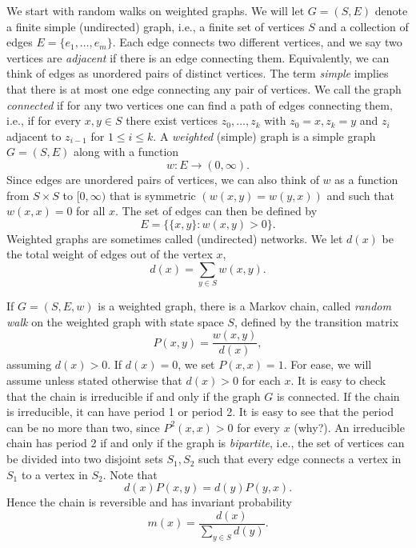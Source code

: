 \documentclass{stml-l}
\theoremstyle{definition}
\numberwithin{equation}{chapter}
\numberwithin{figure}{chapter}
\numberwithin{figure}{section}
\begin{document}
We start with random walks on weighted graphs. We will let $G=(S,E)$
denote a finite simple (undirected) graph, i.e., a finite set of
vertices $S$ and a collection of edges $E=\{e_{1},\ldots,e_{m}\}$.
Each edge connects two different vertices, and we say two vertices
are \emph{adjacent} if there is an edge connecting them.
Equivalently, we can think of edges as unordered pairs of distinct
vertices. The term \emph{simple} implies that there is at most one
edge connecting any pair of vertices. We call the graph
\emph{connected} if for any two vertices one can find a path of
edges connecting them, i.e., if for every $x,y \in S$ there exist
vertices $z_{0},\ldots,z_{k}$ with $z_{0}=x,z_{k}=y$ and $z_{i}$
adjacent to $z_{i-1}$ for $1\leq i\leq k$. A \emph{weighted}
(simple) graph is a simple graph $G=(S,E)$ along with a function
\begin{equation*}
w:E\rightarrow(0,\infty).
\end{equation*}
Since edges are unordered pairs of vertices, we can also think of
$w$ as a function from $S\times S$ to $[0,\infty)$ that is symmetric
$(w(x,y)=w(y,x))$ and such that $w(x,x)=0$ for all $x$. The set of
edges can then be defined by
\begin{equation*}
E=\{\{x,y\}:w(x,y)>0\}.
\end{equation*}
Weighted graphs are sometimes called (undirected) networks. We let
$d(x)$ be the total weight of edges out of the vertex $x$,
\begin{equation*}
d(x)=\sum\limits_{y\in S}w(x,y).
\end{equation*}

If $G=(S,E,w)$ is a weighted graph, there is a Markov chain, called
\emph{random walk} on the weighted graph with state space $S$,
defined by the transition matrix
\begin{equation*}
P(x,y)=\frac{w(x,y)}{d(x)},
\end{equation*}
assuming $d(x)>0$. If $d(x)=0$, we set $P(x,x)=1$. For ease, we will
assume unless stated otherwise that $d(x)>0$ for each $x$. It is
easy to check that the chain is irreducible if and only if the graph
$G$ is connected. If the chain is irreducible, it can have period 1
or period 2. It is easy to see that the period can be no more than
two, since $P^{2}(x,x)>0$ for every $x$ (why?). An irreducible chain
has period 2 if and only if the graph is \emph{bipartite}, i.e., the
set of vertices can be divided into two disjoint sets $S_{1},S_{2}$
such that every edge connects a vertex in $S_{1}$ to a vertex in
$S_{2}$. Note that
\begin{equation*}
d(x)P(x,y)=d(y)P(y,x).
\end{equation*}
Hence the chain is reversible and has invariant probability
\begin{equation*}
m(x)=\frac{d(x)}{\sum_{y\in S}d(y)}.
\end{equation*}
\end{document}
